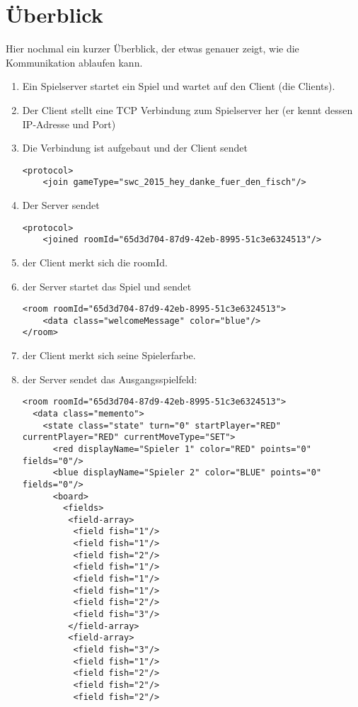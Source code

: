\documentclass[12pt,a4paper, ngerman, oneside]{scrartcl}
\begin{document}
\newpage
\part{Überblick}
Hier nochmal ein kurzer Überblick, der etwas genauer zeigt, wie die Kommunikation ablaufen kann.\bigskip\\

\begin{enumerate}
\item Ein Spielserver startet ein Spiel und wartet auf den Client (die Clients).
\item Der Client stellt eine TCP Verbindung zum Spielserver her (er kennt dessen IP-Adresse und Port)
\item Die Verbindung ist aufgebaut und der Client sendet \begin{verbatim}
<protocol>
    <join gameType="swc_2015_hey_danke_fuer_den_fisch"/>
\end{verbatim}
\item Der Server sendet \begin{verbatim}
<protocol>
    <joined roomId="65d3d704-87d9-42eb-8995-51c3e6324513"/>
\end{verbatim}
\item der Client merkt sich die roomId.
\item der Server startet das Spiel und sendet \begin{verbatim}
<room roomId="65d3d704-87d9-42eb-8995-51c3e6324513">
    <data class="welcomeMessage" color="blue"/>
</room>
\end{verbatim}
\item der Client merkt sich seine Spielerfarbe.
\item der Server sendet das Ausgangsspielfeld: 
\begin{verbatim}
<room roomId="65d3d704-87d9-42eb-8995-51c3e6324513">
  <data class="memento">
    <state class="state" turn="0" startPlayer="RED" currentPlayer="RED" currentMoveType="SET">
      <red displayName="Spieler 1" color="RED" points="0" fields="0"/>
      <blue displayName="Spieler 2" color="BLUE" points="0" fields="0"/>
      <board>
        <fields>
         <field-array>
          <field fish="1"/>
          <field fish="1"/>
          <field fish="2"/>
          <field fish="1"/>
          <field fish="1"/>
          <field fish="1"/>
          <field fish="2"/>
          <field fish="3"/>
         </field-array>
         <field-array>
          <field fish="3"/>
          <field fish="1"/>
          <field fish="2"/>
          <field fish="2"/>
          <field fish="2"/>

\end{verbatim}
\end{enumerate}
\end{document}
